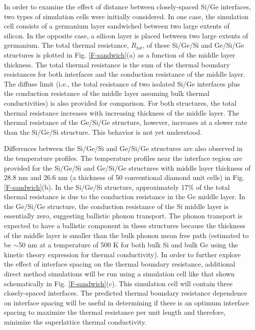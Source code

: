 \documentclass[letterpaper,12pt]{article}
\begin{document}
In order to examine the effect of distance between closely-spaced
Si/Ge interfaces, two types of simulation cells were initially
considered. In one case, the simulation cell consists of a germanium
layer sandwiched between two large extents of silicon. In the
opposite case, a silicon layer is placed between two large extents
of germanium. The total thermal resistance, $R_{tot}$, of these
Si/Ge/Si and Ge/Si/Ge structures is plotted in Fig.
\ref{F-sandwich}(a) as a function of the middle layer thickness. The
total thermal resistance is the sum of the thermal boundary
resistances for both interfaces and the conduction resistance of the
middle layer. The diffuse limit (i.e., the total resistance of two
isolated Si/Ge interfaces plus the conduction resistance of the
middle layer assuming bulk thermal conductivities) is also provided
for comparison. For both structures, the total thermal resistance
increases with increasing thickness of the middle layer. The thermal
resistance of the Ge/Si/Ge structure, however, increases at a slower
rate than the Si/Ge/Si structure. This behavior is not yet
understood.

Differences between the Si/Ge/Si and Ge/Si/Ge structures are also
observed in the temperature profiles. The temperature profiles near
the interface region are provided for the Si/Ge/Si and Ge/Si/Ge
structures with middle layer thickness of 28.8 nm and 26.6 nm (a
thickness of 50 conventional diamond unit cells) in Fig.
\ref{F-sandwich}(b). In the Si/Ge/Si structure, approximately 17\%
of the total thermal resistance is due to the conduction resistance
in the Ge middle layer. In the Ge/Si/Ge structure, the conduction
resistance of the Si middle layer is essentially zero, suggesting
ballistic phonon transport. The phonon transport is expected to have
a ballistic component in these structures because the thickness of
the middle layer is smaller than the bulk phonon mean free path
(estimated to be $\sim$50 nm at a temperature of 500 K for both bulk
Si and bulk Ge using the kinetic theory expression for thermal
conductivity). In order to further explore the effect of interface
spacing on the thermal boundary resistance, additional direct method
simulations will be run using a simulation cell like that shown
schematically in Fig. \ref{F-sandwich}(c). This simulation cell will
contain three closely-spaced interfaces. The predicted thermal
boundary resistance dependence on interface spacing will be useful
in determining if there is an optimum interface spacing to maximize
the thermal resistance per unit length and therefore, minimize the
superlattice thermal conductivity.
\end{document}
